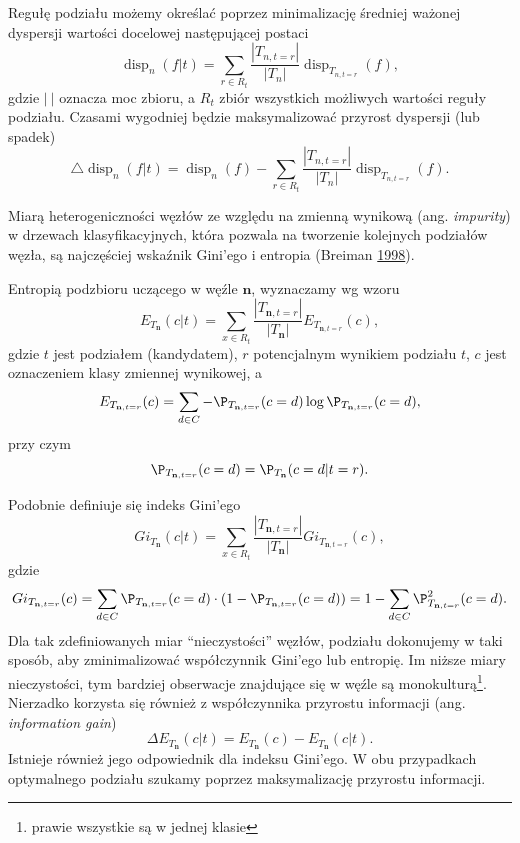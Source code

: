 \documentclass[
]{book}
\theoremstyle{plain}
\theoremstyle{definition}
\theoremstyle{definition}
\theoremstyle{definition}
\theoremstyle{definition}
\theoremstyle{remark}
\begin{document}
Regułę podziału możemy określać poprzez minimalizację średniej ważonej dyspersji wartości docelowej następującej postaci
\begin{equation}\label{reg_podz}
        \operatorname{disp}_n(f|t)=\sum_{r\in R_t}\frac{|T_{n,t=r}|}{|T_n|}\operatorname{disp}_{T_{n,t=r}}(f),
\end{equation}
gdzie \(|\  |\) oznacza moc zbioru, a \(R_t\) zbiór wszystkich możliwych wartości reguły podziału. Czasami wygodniej będzie maksymalizować przyrost dyspersji (lub spadek)
\begin{equation}\label{przyrost}
        \bigtriangleup \operatorname{disp}_n(f|t)=\operatorname{disp}_n(f)-\sum_{r\in R_t}\frac{|T_{n,t=r}|}{|T_n|}\operatorname{disp}_{T_{n,t=r}}(f).
\end{equation}

Miarą heterogeniczności węzłów ze względu na zmienną wynikową (ang. \emph{impurity}) w drzewach klasyfikacyjnych, która pozwala na tworzenie kolejnych podziałów węzła, są najczęściej wskaźnik Gini'ego i entropia (Breiman \protect\hyperlink{ref-breiman1998}{1998}).

Entropią podzbioru uczącego w węźle \(\mathbf{n}\), wyznaczamy wg wzoru
\begin{equation}
E_{T_{\mathbf{n}}}(c|t) = \sum_{x\in R_t} \frac{|T_{\mathbf{n}, t=r}|}{|T_{\mathbf{n}}|}E_{T_{\mathbf{n}, t=r}}(c),
\end{equation}
gdzie \(t\) jest podziałem (kandydatem), \(r\) potencjalnym wynikiem podziału \(t\), \(c\) jest oznaczeniem klasy zmiennej wynikowej, a
\begin{equation}
    E_{T_{\mathbf{n}, t=r}}(c) = \sum_{d\in C}-\P_{T_{\mathbf{n}, t=r}}(c=d)\log\P_{T_{\mathbf{n}, t=r}}(c=d),
\end{equation}
przy czym
\begin{equation}
    \P_{T_{\mathbf{n}, t=r}}(c=d)= \P_{T_{\mathbf{n}}}(c=d|t=r).
\end{equation}

Podobnie definiuje się indeks Gini'ego
\begin{equation}
Gi_{T_{\mathbf{n}}}(c|t) = \sum_{x\in R_t} \frac{|T_{\mathbf{n}, t=r}|}{|T_{\mathbf{n}}|}Gi_{T_{\mathbf{n}, t=r}}(c),
\end{equation}
gdzie
\begin{equation}
    Gi_{T_{\mathbf{n}, t=r}}(c) = \sum_{d\in C}\P_{T_{\mathbf{n}, t=r}}(c=d)\cdot(1-\P_{T_{\mathbf{n}, t=r}}(c=d))= 1-\sum_{d\in C}\P^2_{T_{\mathbf{n}, t=r}}(c=d).
\end{equation}
Dla tak zdefiniowanych miar ``nieczystości'' węzłów, podziału dokonujemy w taki sposób, aby zminimalizować współczynnik Gini'ego lub entropię. Im niższe miary nieczystości, tym bardziej obserwacje znajdujące się w węźle są monokulturą\footnote{prawie wszystkie są w jednej klasie}. Nierzadko korzysta się również z współczynnika przyrostu informacji (ang. \emph{information gain})
\begin{equation}
    \Delta E_{T_{\mathbf{n}}}(c|t)=E_{T_{\mathbf{n}}}(c)-E_{T_{\mathbf{n}}}(c|t).
\end{equation}
Istnieje również jego odpowiednik dla indeksu Gini'ego. W obu przypadkach optymalnego podziału szukamy poprzez maksymalizację przyrostu informacji.
\end{document}
